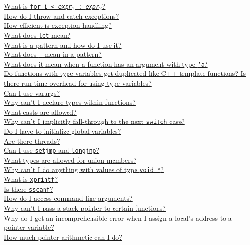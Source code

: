 \begin{small}
\hyperlink{faq:arrayinit}{What is \texttt{\lb for i < {\it expr}$_1$ : {\it expr}$_2$\rb}?}\\
\hyperlink{faq:exns}{How do I throw and catch exceptions?}\\
\hyperlink{faq:exn-efficiency}{How efficient is exception handling?}\\
\hyperlink{faq:let}{What does \texttt{let} mean?}\\
\hyperlink{faq:pattern}{What is a pattern and how do I use it?}\\
\hyperlink{faq:uscore-pattern}{What does \texttt{_} mean in a pattern?}\\
\hyperlink{faq:polymorphic}{What does it mean when a function has an argument with type \texttt{`a}?}\\
\hyperlink{faq:templates}{Do functions with type variables get duplicated like C++ template functions?  Is there run-time overhead for using type variables?}\\
\hyperlink{faq:vararg}{Can I use varargs?}\\
\hyperlink{faq:typesinfunctions}{Why can't I declare types within functions?}\\
\hyperlink{faq:casts}{What casts are allowed?}\\
\hyperlink{faq:implicitfallthru}{Why can't I implicitly fall-through to the next \texttt{switch} case?}\\
\hyperlink{faq:globalinit}{Do I have to initialize global variables?}\\
\hyperlink{faq:threads}{Are there threads?}\\
\hyperlink{faq:setjmp}{Can I use \texttt{setjmp} and \texttt{longjmp}?}\\
\hyperlink{faq:uniontypes}{What types are allowed for union members?}\\
\hyperlink{faq:voidstar2}{Why can't I do anything with values of type \texttt{void *}?}\\
\hyperlink{faq:xprintf}{What is \texttt{xprintf}?}\\
\hyperlink{faq:sscanf}{Is there \texttt{sscanf}?}\\
\hyperlink{faq:commandline}{How do I access command-line arguments?}\\
\hyperlink{faq:stackpointer}{Why can't I pass a stack pointer to certain functions?}\\
\hyperlink{faq:localaddress}{Why do I get an incomprehensible error when I assign a local's address to a pointer variable?}\\
\hyperlink{faq:pointerarith}{How much pointer arithmetic can I do?}\\

\end{small}
